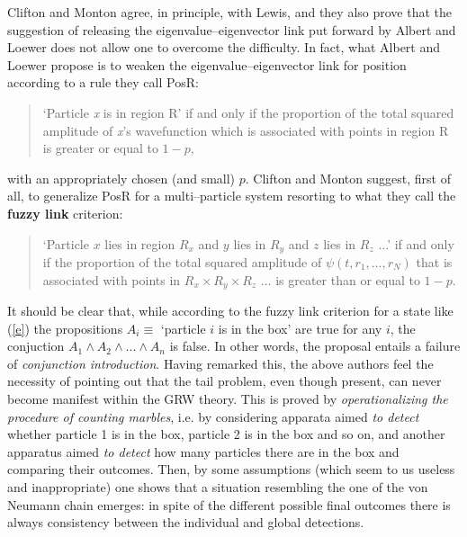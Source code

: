 \documentclass[10pt,a4paper]{article}
\begin{document}
Clifton and Monton \cite{cli1} agree, in principle, with Lewis,
and they also prove that the suggestion of releasing the
eigenvalue--eigenvector link put forward by Albert and Loewer
\cite{alo1} does not allow one to overcome the difficulty. In
fact, what Albert and Loewer propose is to weaken the
eigenvalue--eigenvector link for position according to a rule they
call PosR:
\begin{quotation}
`Particle {\it x} is in region R' if and only if the proportion of
the total squared amplitude of {\it x}'s wavefunction which is
associated with points in region R is greater or equal to $1-p,$
\end{quotation}
with an appropriately chosen (and small) $p$. Clifton and Monton
suggest, first of all, to generalize PosR for a multi--particle
system resorting to what they call the {\bf fuzzy link} criterion:
\begin{quotation}
`Particle $x$ lies in region $R_{x}$ and $y$ lies in $R_{y}$ and
$z$ lies in $R_{z}$ ...' if and only if the proportion of the
total squared amplitude of $\psi (t,r_{1},...,r_{N})$ that is
associated with points in $R_{x}\times R_{y} \times R_{z}$ ... is
greater than or equal to $1-p$.
\end{quotation}

It should be clear that, while according to the fuzzy link criterion for a
state like (\ref{e}) the propositions $A_{i}\equiv $ `particle $i$
is in the box' are true for any $i$, the conjuction $A_{1}\wedge
A_{2}\wedge ...\wedge A_{n}$ is false. In other words, the
proposal entails a failure of {\it conjunction introduction}.
Having remarked this, the above authors feel the necessity of
pointing out that the tail problem, even though present, can never
become manifest within the GRW theory. This is proved by {\it
operationalizing the procedure of counting marbles}, i.e. by
considering apparata aimed {\it to detect} whether particle 1 is
in the box, particle 2 is in the box and so on, and another
apparatus aimed {\it to detect} how many particles there are in
the box and comparing their outcomes. Then, by some assumptions
(which seem to us useless and inappropriate) one shows that a
situation resembling the one of the von Neumann chain emerges: in
spite of the different possible final outcomes there is always
consistency between the individual and global detections.
\end{document}
